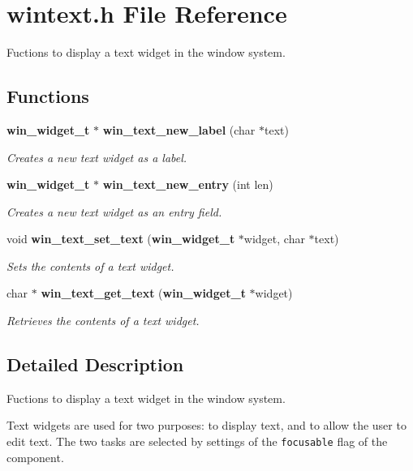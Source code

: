 \section{wintext.h File Reference}
\label{wintext_8h}
Fuctions to display a text widget in the window system. 

\subsection*{Functions}
\begin{CompactItemize}
\item 
{\bf win\_\-widget\_\-t} $\ast$ {\bf win\_\-text\_\-new\_\-label} (char $\ast$text)
\begin{CompactList}\small\item\em Creates a new text widget as a label. \item\end{CompactList}\item 
{\bf win\_\-widget\_\-t} $\ast$ {\bf win\_\-text\_\-new\_\-entry} (int len)
\begin{CompactList}\small\item\em Creates a new text widget as an entry field. \item\end{CompactList}\item 
void {\bf win\_\-text\_\-set\_\-text} ({\bf win\_\-widget\_\-t} $\ast$widget, char $\ast$text)
\begin{CompactList}\small\item\em Sets the contents of a text widget. \item\end{CompactList}\item 
char $\ast$ {\bf win\_\-text\_\-get\_\-text} ({\bf win\_\-widget\_\-t} $\ast$widget)
\begin{CompactList}\small\item\em Retrieves the contents of a text widget. \item\end{CompactList}\end{CompactItemize}


\subsection{Detailed Description}
Fuctions to display a text widget in the window system. 

Text widgets are used for two purposes: to display text, and to allow the user to edit text. The two tasks are selected by settings of the {\tt focusable} flag of the component. 

